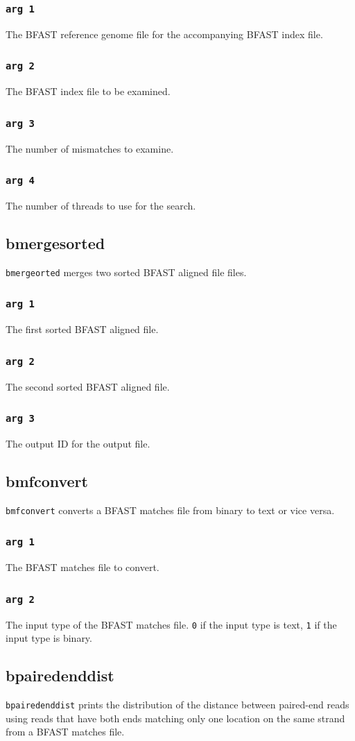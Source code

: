 \documentclass[a4paper,12pt]{book}
\newcommand{\TT}[1]{{\tt #1}} %
\newcommand{\BRGF}{BFAST reference genome file} %
\newcommand{\BIF}{BFAST index file} %
\newcommand{\BMF}{BFAST matches file} %
\newcommand{\BAF}{BFAST aligned file} %
\begin{document}
\subsubsection{\TT{arg 1}}
The \BRGF{} for the accompanying \BIF{}.
\subsubsection{\TT{arg 2}}
The \BIF{} to be examined.
\subsubsection{\TT{arg 3}}
The number of mismatches to examine.
\subsubsection{\TT{arg 4}}
The number of threads to use for the search.
\subsection{bmergesorted}
\TT{bmergeorted} merges two sorted \BAF{} files.
\subsubsection{\TT{arg 1}}
The first sorted \BAF{}.
\subsubsection{\TT{arg 2}}
The second sorted \BAF{}.
\subsubsection{\TT{arg 3}}
The output ID for the output file.

\subsection{bmfconvert}
\label{sec:bmfconvert}
\TT{bmfconvert} converts a \BMF{} from binary to text or vice versa.
\subsubsection{\TT{arg 1}}
The \BMF{} to convert.
\subsubsection{\TT{arg 2}}
The input type of the \BMF{}. 
\TT{0} if the input type is text, \TT{1} if the input type is binary.
\subsection{bpairedenddist}
\label{sec:bpairedenddist}
\TT{bpairedenddist} prints the distribution of the distance between paired-end reads using reads that have both ends matching only one location on the same strand from a \BMF{}.
\end{document}
